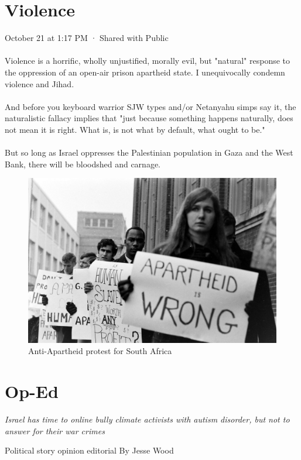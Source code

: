 \documentclass[16pt,openany,oneside]{book}
\begin{document}
\chapter{Violence}

October 21 at 1:17 PM
  · 
Shared with Public
\\\\
Violence is a horrific, wholly unjustified, morally evil, but "natural" response to the oppression of an open-air prison apartheid state. I unequivocally condemn violence and Jihad. 
\\\\
And before you keyboard warrior SJW types and/or Netanyahu simps say it, the naturalistic fallacy implies that "just because something happens naturally, does not mean it is right. What is, is not what by default, what ought to be."
\\\\
But so long as Israel oppresses the Palestinian population in Gaza and the West Bank, there will be bloodshed and carnage.

\begin{figure}[H]
    \centering
    \includegraphics[width=0.9\linewidth]{assets/apartheid.jpg}
    \caption{Anti-Apartheid protest for South Africa}
    \label{fig:apartheid}
\end{figure}

\chapter{Op-Ed}

\textit{Israel has time to online bully climate activists with autism disorder, but not to answer for their war crimes}

Political story opinion editorial
By Jesse Wood
\end{document}
